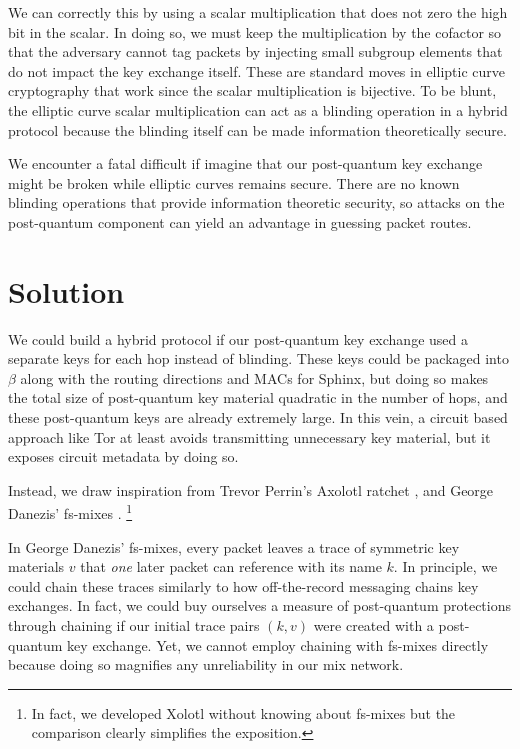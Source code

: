 \documentclass[twoside,letterpaper]{llncs}
\begin{document}
We can correctly this by using a scalar multiplication that does not
zero the high bit in the scalar.  In doing so, we must keep the
multiplication by the cofactor so that the adversary cannot tag
packets by injecting small subgroup elements that do not impact the
key exchange itself.  These are standard moves in elliptic curve 
cryptography that work since the scalar multiplication is bijective.
To be blunt, the elliptic curve scalar multiplication can act as
a blinding operation in a hybrid protocol because the blinding itself
can be made information theoretically secure.

We encounter a fatal difficult if imagine that our post-quantum key 
exchange might be broken while elliptic curves remains secure.  
There are no known blinding operations that provide information
theoretic security, so attacks on the post-quantum component can
yield an advantage in guessing packet routes.


\section{Solution}

We could build a hybrid protocol if our post-quantum key exchange
used a separate keys for each hop instead of blinding.  These keys
could be packaged into $\beta$ along with the routing directions and
MACs for Sphinx, but doing so makes the total size of post-quantum 
key material quadratic in the number of hops, and these post-quantum
keys are already extremely large.
In this vein, a circuit based approach like Tor at least avoids
transmitting unnecessary key material, but it exposes circuit
metadata by doing so. 

Instead, we draw inspiration from Trevor Perrin's Axolotl ratchet
\cite{TextSecure}, and George Danezis' fs-mixes \cite{fs-mix}.
\footnote{In fact, we developed Xolotl without knowing about fs-mixes
but the comparison clearly simplifies the exposition.}


In George Danezis' fs-mixes, every packet leaves a trace of symmetric
key materials $v$ that {\it one} later packet can reference with its
name $k$.  In principle, we could chain these traces similarly to
how off-the-record messaging \cite{OtR} chains key exchanges.
In fact, we could buy ourselves a measure of post-quantum protections
through chaining if our initial trace pairs $(k,v)$ were created with
a post-quantum key exchange.  Yet, we cannot employ chaining with
fs-mixes directly because doing so magnifies any unreliability in
our mix network. 
\end{document}
